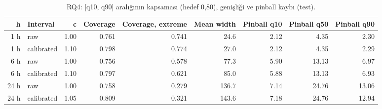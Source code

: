 \begin{table}[t]
\caption{RQ4: [q10, q90] aralığının kapsaması (hedef 0,80), genişliği ve pinball kaybı (test).}
\label{tab:rq4_coverage}
\centering\footnotesize
\begin{tabular}{rlrrrrrrr}
\toprule
h & Interval & c & Coverage & Coverage, extreme & Mean width & Pinball q10 & Pinball q50 & Pinball q90 \\
\midrule
1 h & raw & 1.00 & 0.761 & 0.741 & 24.6 & 2.12 & 4.35 & 2.30 \\
1 h & calibrated & 1.10 & 0.798 & 0.774 & 27.0 & 2.12 & 4.35 & 2.29 \\
6 h & raw & 1.00 & 0.756 & 0.578 & 77.3 & 5.90 & 13.13 & 6.97 \\
6 h & calibrated & 1.10 & 0.797 & 0.621 & 85.0 & 5.88 & 13.13 & 6.93 \\
24 h & raw & 1.00 & 0.758 & 0.279 & 136.7 & 7.14 & 24.76 & 13.06 \\
24 h & calibrated & 1.05 & 0.809 & 0.321 & 143.6 & 7.18 & 24.76 & 12.94 \\
\bottomrule
\end{tabular}
\end{table}
